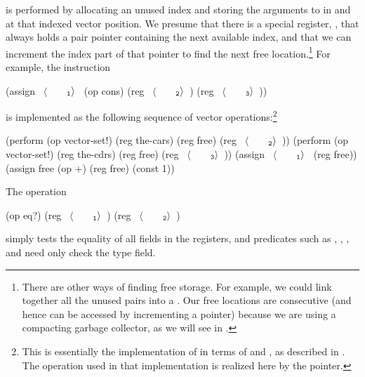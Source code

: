 \noindent
{} is performed by allocating an unused index and storing the
arguments to  in  and  at that indexed
vector position.  We presume that there is a special register, ,
that always holds a pair pointer containing the next available index, and that
we can increment the index part of that pointer to find the next free
location.\footnote{There are other ways of finding free storage.  For example,
we could link together all the unused pairs into a .  Our
free locations are consecutive (and hence can be accessed by incrementing a
pointer) because we are using a compacting garbage collector, as we will see in
.}  For example, the instruction

\begin{codeBlock}
(assign ~\(\langle \)~~~~\(_{\mono{1}}\rangle \)~ (op cons) (reg ~\(\langle \)~~~~\(_{\mono{2}}\rangle \)~) (reg ~\(\langle \)~~~~\(_{\mono{3}}\rangle \)~))
\end{codeBlock}

\noindent
is implemented as the following sequence of vector operations:\footnote{This is
essentially the implementation of  in terms of  and
, as described in .  The operation
 used in that implementation is realized here by the
 pointer.}

\begin{codeBlock}
(perform (op vector-set!)
         (reg the-cars)
         (reg free)
         (reg ~\(\langle \)~~~~\(_{\mono{2}}\rangle \)~))
(perform (op vector-set!)
         (reg the-cdrs)
         (reg free)
         (reg ~\(\langle \)~~~~\(_{\mono{3}}\rangle \)~))
(assign ~\(\langle \)~~~~\(_{\mono{1}}\rangle \)~ (reg free))
(assign free (op +) (reg free) (const 1))
\end{codeBlock}

\noindent
The  operation

\begin{codeBlock}
(op eq?) (reg ~\(\langle \)~~~~\(_{\mono{1}}\rangle \)~) (reg ~\(\langle \)~~~~\(_{\mono{2}}\rangle \)~)
\end{codeBlock}

\noindent
simply tests the equality of all fields in the registers, and predicates such
as , , , and  need only
check the type field.

